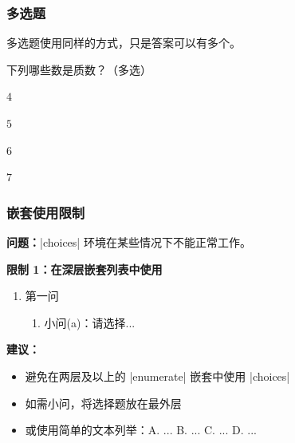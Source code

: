 \subsubsection{多选题}

多选题使用同样的方式，只是答案可以有多个。

\begin{latexcode}
  \begin{question}
    下列哪些数是质数？（多选）\paren[BD]
    \begin{choices}
      \item $4$
      \item $5$   %
      \item $6$
      \item $7$   %
    \end{choices}
  \end{question}
\end{latexcode}

\subsubsection{嵌套使用限制}

\textbf{问题：}|choices| 环境在某些情况下不能正常工作。

\textbf{限制 1：在深层嵌套列表中使用}

\begin{latexcode}
  \begin{question}
    \begin{enumerate}
      \item 第一问
        \begin{enumerate}
          \item 小问(a)：请选择...\paren[A]
        \end{enumerate}
    \end{enumerate}
  \end{question}
\end{latexcode}

\textbf{建议：}
\begin{itemize}
  \item 避免在两层及以上的 |enumerate| 嵌套中使用 |choices|
  \item 如需小问，将选择题放在最外层
  \item 或使用简单的文本列举：A. ... B. ... C. ... D. ...
\end{itemize}

